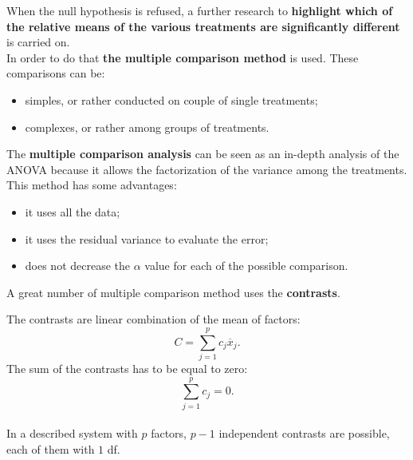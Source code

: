 
\begin{frame}
  \vspace*{.75cm}
  When the null hypothesis is refused, a further research to \textbf{highlight which of the relative means of the various treatments are significantly different} is carried on.\\
  \vspace*{.75cm}
  In order to do that \textbf{the multiple comparison method} is used. These comparisons can be:
  \begin{itemize}
    \item simples, or rather conducted on couple of single treatments;
    \item complexes, or rather among groups of treatments.
  \end{itemize}
\end{frame}

\begin{frame}
  \vspace*{.75cm}
  The \textbf{multiple comparison analysis} can be seen as an in-depth analysis of the ANOVA because it allows the factorization of the variance among the treatments. This method has some advantages:
  \vspace*{.50cm}
  \begin{itemize}
    \item it uses all the data;
    \item it uses the residual variance to evaluate the error;
    \item does not decrease the {\boldmath $ \alpha $} value for each of the possible comparison.
  \end{itemize}
  \vspace*{.75cm}
  A great number of multiple comparison method uses the \textbf{contrasts}.\\
\end{frame}

\begin{frame}
  \vspace*{.25cm}
  The contrasts are linear combination of the mean of factors:
  $$ C = \sum_{j=1}^p{c_j\overline{x}_j} \mbox{.} $$
  The sum of the contrasts has to be equal to zero:
  $$ \sum_{j=1}^p{c_j} = 0 \mbox{.} $$ \\
  \vspace*{.5cm}
  In a described system with $ p $ factors, $ p-1 $ independent contrasts are possible, each of them with $ 1 $ df.\\
\end{frame}

